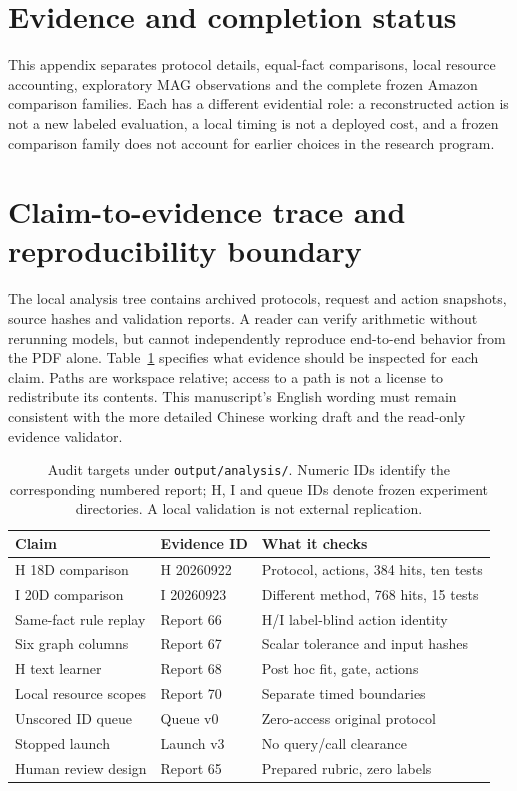 \section{Evidence and completion status}
This appendix separates protocol details, equal-fact comparisons, local
resource accounting, exploratory MAG observations and the complete frozen
Amazon comparison families. Each has a different evidential role: a
reconstructed action is not a new labeled evaluation, a local timing is
not a deployed cost, and a frozen comparison family does not account
for earlier choices in the research program.

\section{Claim-to-evidence trace and reproducibility boundary}\label{app:trace}
The local analysis tree contains archived protocols, request and action
snapshots, source hashes and validation reports. A reader can verify
arithmetic without rerunning models, but cannot independently reproduce
end-to-end behavior from the PDF alone. Table~\ref{tab:trace} specifies
what evidence should be inspected for each claim. Paths are workspace
relative; access to a path is not a license to redistribute its contents.
This manuscript's English wording must remain consistent with the
more detailed Chinese working draft and the read-only evidence validator.

\begin{table}[h]
\centering
\caption{Audit targets under \texttt{output/analysis/}. Numeric IDs identify
the corresponding numbered report; H, I and queue IDs denote frozen
experiment directories. A local validation is not external replication.}
\label{tab:trace}\small
\begin{tabular}{p{5cm}p{2.7cm}p{4.5cm}}
\toprule
Claim & Evidence ID & What it checks \\
\midrule
H 18D comparison & H 20260922 & Protocol, actions, 384 hits, ten tests \\
I 20D comparison & I 20260923 & Different method, 768 hits, 15 tests \\
Same-fact rule replay & Report 66 & H/I label-blind action identity \\
Six graph columns & Report 67 & Scalar tolerance and input hashes \\
H text learner & Report 68 & Post hoc fit, gate, actions \\
Local resource scopes & Report 70 & Separate timed boundaries \\
Unscored ID queue & Queue v0 & Zero-access original protocol \\
Stopped launch & Launch v3 & No query/call clearance \\
Human review design & Report 65 & Prepared rubric, zero labels \\
\bottomrule
\end{tabular}
\end{table}

